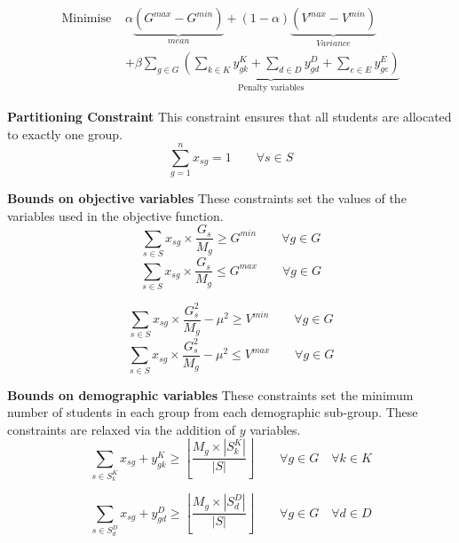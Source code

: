\documentclass[12pt]{ORSNZ}
\begin{document}
\begin{description}
\begin{equation}\begin{split}
\mbox{Minimise }& \alpha\underbrace{(G^{max} - G^{min})}_{mean} + (1-\alpha)\underbrace{(V^{max} - V^{min})}_{Variance} \\&+ \beta\underbrace{\sum_{g \in G}\left(\sum_{k \in K}y^K_{gk} + \sum_{d \in D}y^D_{gd} + \sum_{e \in E}y^E_{ge}\right)}_{\mbox{Penalty variables}}
\end{split}\end{equation}

\textbf{Partitioning Constraint} This constraint ensures that all students are allocated to exactly one group.
\begin{equation} \label{con1}
\sum_{g=1}^n x_{sg} =  1 \qquad \mbox{$\forall s \in S$}
\end{equation}

\textbf{Bounds on objective variables} These constraints set the values of the variables used in the objective function.
\begin{equation} \label{con2}
\sum_{s \in S} x_{sg}\times \frac{G_s}{M_g} \geq G^{min} \qquad \mbox{$\forall g \in G$}
\end{equation}
\begin{equation} \label{con2}
\sum_{s \in S} x_{sg}\times \frac{G_s}{M_g} \leq G^{max} \qquad \mbox{$\forall g \in G$}
\end{equation}

\begin{equation} \label{con2}
\sum_{s \in S} x_{sg}\times \frac{G_s^2}{M_g}  - \mu^2 \geq V^{min} \qquad\mbox{$\forall g \in G$}
\end{equation}
\begin{equation} \label{con2}
\sum_{s \in S} x_{sg}\times \frac{G_s^2}{M_g}  - \mu^2 \leq V^{max} \qquad\mbox{$\forall g \in G$}
\end{equation}


\textbf{Bounds on demographic variables} These constraints set the minimum number of students in each group from each demographic sub-group. These constraints are relaxed via the addition of $y$ variables.
\begin{equation} \label{con2}
\sum_{s \in S^K_k} x_{sg} + y^K_{gk} \geq \left\lfloor\frac{M_g\times |S^K_k|}{|S|}\right\rfloor \qquad \mbox{$\forall g \in G \quad \forall k \in K$}
\end{equation}

\begin{equation} \label{con2}
\sum_{s \in S^D_d} x_{sg} + y^D_{gd}  \geq \left\lfloor\frac{M_g\times |S^D_d|}{|S|}\right\rfloor \qquad \mbox{$\forall g \in G \quad \forall d \in D$}
\end{equation}


\end{description}
\end{document}
